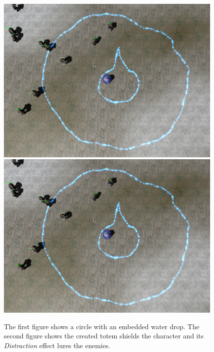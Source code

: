 \begin{figure}[p]
\centering
\includegraphics[width=.9\linewidth]{ext/scr/embwaterDrop.png}
\quad
\includegraphics[width=.9\linewidth]{ext/scr/embwaterDrop.png}
\caption{The first figure shows a circle with an embedded water drop. The second figure shows the created totem shields the character and its \emph{Distraction} effect lures the enemies.}
\label{fig:spell:embwaterDrop}
\end{figure}


